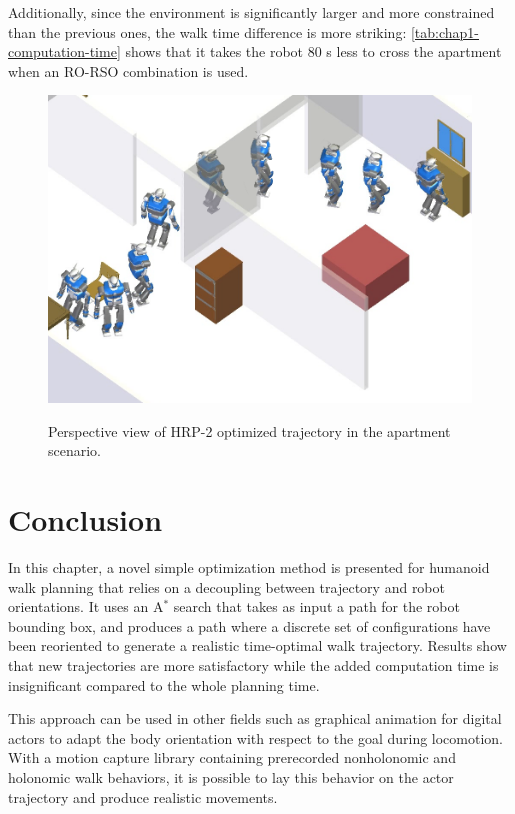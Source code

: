 Additionally, since the environment is significantly larger and more
constrained than the previous ones, the walk time difference is more
striking: \autoref{tab:chap1-computation-time} shows that it takes the robot
80 s less to cross the apartment when an RO-RSO combination is used.

\begin{figure}
  \centering
      {\includegraphics[width = \linewidth]
        {src/chap1-path-optimization/apartment-hash-optim-perspective-hrp2.png}}
      \caption{Perspective view of HRP-2 optimized trajectory in the
        apartment scenario.}
      \label{fig:chap1-apartment-hash-optim-perspective-hrp2}
\end{figure}

\section{Conclusion}
In this chapter, a novel simple optimization method is
presented for humanoid walk planning that relies on a decoupling
between trajectory and robot orientations. It uses an A$^{*}$ search that
takes as input a path for the robot bounding box, and produces a path
where a discrete set of configurations have been reoriented to generate
a realistic time-optimal walk trajectory. Results show that new
trajectories are more satisfactory while the added computation time is
insignificant compared to the whole planning time.

This approach can be used in other fields such as graphical animation
for digital actors to adapt the body orientation with respect to the
goal during locomotion. With a motion capture library containing
prerecorded nonholonomic and holonomic walk behaviors, it is possible
to lay this behavior on the actor trajectory and produce realistic
movements.

